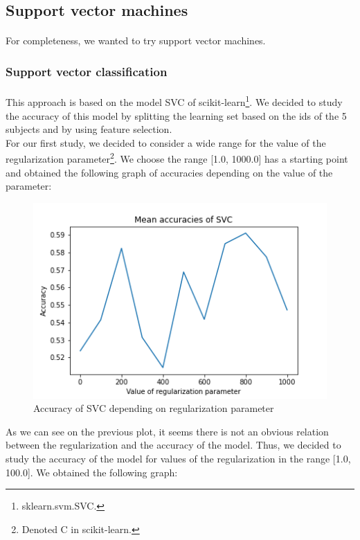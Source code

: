 \documentclass[a4paper, 11pt, oneside]{article}
\begin{document}
\subsection{Support vector machines}
\paragraph{}For completeness, we wanted to try support vector machines.

\subsubsection{Support vector classification} \label{subsubsec:svc}
\paragraph{}This approach is based on the model SVC of scikit-learn\footnote{sklearn.svm.SVC.}. We decided to study the accuracy of this model by splitting the learning set based on the ids of the 5 subjects and by using feature selection.\\
For our first study, we decided to consider a wide range for the value of the regularization parameter\footnote{Denoted C in scikit-learn.}. We choose the range [1.0, 1000.0] has a starting point and obtained the following graph of accuracies depending on the value of the parameter:
\begin{figure}[H]
\centering
\includegraphics[scale=0.4]{svm/svm_svc_accuracies_1.png}
\caption{Accuracy of SVC depending on regularization parameter}
\end{figure}
As we can see on the previous plot, it seems there is not an obvious relation between the regularization and the accuracy of the model. Thus, we decided to study the accuracy of the model for values of the regularization in the range [1.0, 100.0]. We obtained the following graph:
\end{document}
